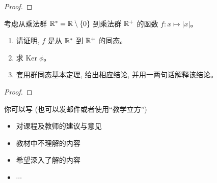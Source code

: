 \documentclass[a4paper, justified]{tufte-handout}
\begin{document}
\begin{proof}
\end{proof}

\begin{problem}[\score{5 = 2 + 1 + 2} $\star\star\star$]
  考虑从乘法群 $\mathbb{R}^{\ast} = \mathbb{R} \setminus \{0\}$
  到乘法群 $\mathbb{R}^{+}$ 的函数 $f: x \mapsto |x|$。
  \begin{enumerate}[(1)]
    \item 请证明, $f$ 是从 $\mathbb{R}^{\ast}$ 到 $\mathbb{R}^{+}$ 的同态。
    \item 求 $\text{Ker}\; \phi$。
    \item 套用群同态基本定理, 给出相应结论, 并用一两句话解释该结论。
  \end{enumerate}
\end{problem}

\begin{proof}
\end{proof}

\begincorrection

\beginfb

你可以写 (也可以发邮件或者使用``教学立方'')
\begin{itemize}
  \item 对课程及教师的建议与意见
  \item 教材中不理解的内容
  \item 希望深入了解的内容
  \item $\cdots$
\end{itemize}
\end{document}
